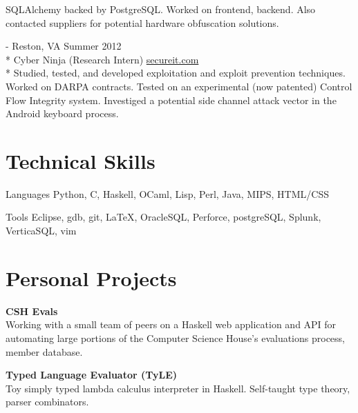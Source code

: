 \documentclass[letter,margin,line]{resume}
\newcommand{\rurl}[1]{\hfill {\footnotesize \url{#1}}}
\newcommand{\rdate}[1]{\hfill {\small #1}}
\renewcommand{\employer}[6]{\item[#1] - #2 \rdate{#3} \\* #4 \rurl{#5}\\* #6}
\newcommand{\project}[2]{\item {\bf #1}\\{\small #2}}
\begin{document}
\begin{resume}
\begin{asparadesc}
{                      SQLAlchemy backed by PostgreSQL.
                      Worked on frontend, backend. Also contacted suppliers
                      for potential hardware obfuscation solutions.
                     }\\
            \employer{SecureIT}
                     {Reston, VA}
                     {Summer 2012}
                     {Cyber Ninja (Research Intern)}
                     {secureit.com}
                     {Studied, tested, and developed exploitation and
                      exploit prevention techniques.
                      Worked on DARPA contracts. 
                      Tested on an experimental (now patented)
                      Control Flow Integrity system.
                      Investiged a potential side channel attack vector
                      in the Android keyboard process.
                     }
        \end{asparadesc}

        \section{\mysidestyle Technical Skills}
        \begin{compactdesc}
        \item[Languages] { \small
                 Python,
                 C,
                 Haskell,
                 OCaml,
                 Lisp,
                 Perl,
                 Java,
                 MIPS,
                 HTML/CSS
            }
        \item[Tools] { \small
                Eclipse,
                gdb,
                git,
                \LaTeX,
                OracleSQL,
                Perforce,
                postgreSQL,
                Splunk,
                VerticaSQL,
                vim
            }
        \end{compactdesc}
        \section{\mysidestyle Personal Projects}
        \begin{asparablank}
            \project{CSH Evals}
            {
                Working with a small team of peers on a Haskell web application
                and API for automating large portions of the Computer Science
                House's evaluations process, member database.
            }\\
            \project{Typed Language Evaluator (TyLE)}
            {
                Toy simply typed lambda calculus interpreter in Haskell.
                Self-taught type theory, parser combinators.
            }
        \end{asparablank}

\end{resume}
\end{document}
